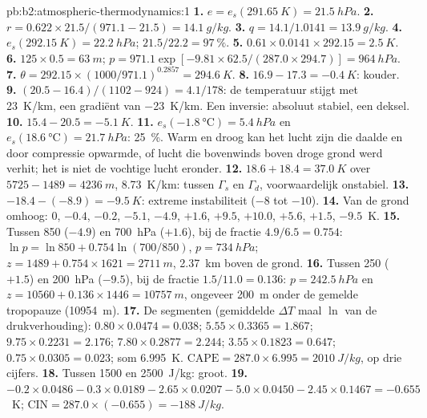 \begin{solution}{pb:b2:atmospheric-thermodynamics:1}
\textbf{1.} $e = e_s(\qty{291.65}{K}) = \qty{21.5}{hPa}$.
\textbf{2.} $r = 0.622 \times 21.5/(971.1 - 21.5) = \qty{14.1}{g/kg}$.
\textbf{3.} $q = 14.1/1.0141 = \qty{13.9}{g/kg}$.
\textbf{4.} $e_s(\qty{292.15}{K}) = \qty{22.2}{hPa}$; $21.5/22.2 = \qty{97}{\percent}$.
\textbf{5.} $0.61 \times 0.0141 \times 292.15 = \qty{2.5}{K}$.
\textbf{6.} $125 \times 0.5 = \qty{63}{m}$; $p = 971.1 \exp[-9.81 \times 62.5/(287.0 \times 294.7)]
= \qty{964}{hPa}$.
\textbf{7.} $\theta = 292.15 \times (1000/971.1)^{0.2857} = \qty{294.6}{K}$.
\textbf{8.} $16.9 - 17.3 = \qty{-0.4}{K}$: kouder.
\textbf{9.} $(20.5 - 16.4)/(1102 - 924) = 4.1/178$: de temperatuur stijgt met \qty{23}{K/km}, een
gradiënt van \qty{-23}{K/km}. Een inversie: absoluut stabiel, een deksel.
\textbf{10.} $15.4 - 20.5 = \qty{-5.1}{K}$.
\textbf{11.} $e_s(\qty{-1.8}{\celsius}) = \qty{5.4}{hPa}$ en $e_s(\qty{18.6}{\celsius}) =
\qty{21.7}{hPa}$: \qty{25}{\percent}. Warm en droog kan het lucht zijn die daalde en door
compressie opwarmde, of lucht die bovenwinds boven droge grond werd verhit; het is niet de vochtige lucht eronder.
\textbf{12.} $18.6 + 18.4 = \qty{37.0}{K}$ over $5725 - 1489 = \qty{4236}{m}$, \qty{8.73}{K/km}: tussen $\Gamma_s$ en
$\Gamma_d$, voorwaardelijk onstabiel.
\textbf{13.} $-18.4 - (-8.9) = \qty{-9.5}{K}$: extreme instabiliteit ($-8$ tot $-10$).
\textbf{14.} Van de grond omhoog: 0, $-0.4$, $-0.2$, $-5.1$, $-4.9$, $+1.6$, $+9.5$, $+10.0$,
$+5.6$, $+1.5$, $-9.5$~\unit{K}.
\textbf{15.} Tussen 850 ($-4.9$) en \qty{700}{hPa} ($+1.6$), bij de fractie $4.9/6.5 = 0.754$:
$\ln p = \ln 850 + 0.754 \ln(700/850)$, $p = \qty{734}{hPa}$; $z = 1489 + 0.754 \times 1621 =
\qty{2711}{m}$, \qty{2.37}{km} boven de grond.
\textbf{16.} Tussen 250 ($+1.5$) en \qty{200}{hPa} ($-9.5$), bij de fractie $1.5/11.0 =
0.136$: $p = \qty{242.5}{hPa}$ en $z = 10560 + 0.136 \times 1446 = \qty{10757}{m}$, ongeveer
\qty{200}{m} onder de gemelde tropopauze (\qty{10954}{m}).
\textbf{17.} De segmenten (gemiddelde $\Delta T$ maal $\ln$ van de drukverhouding): $0.80 \times 0.0474
= 0.038$; $5.55 \times 0.3365 = 1.867$; $9.75 \times 0.2231 = 2.176$; $7.80 \times 0.2877 =
2.244$; $3.55 \times 0.1823 = 0.647$; $0.75 \times 0.0305 = 0.023$; som \qty{6.995}{K}.
$\text{CAPE} = 287.0 \times 6.995 = \qty{2010}{J/kg}$, op drie cijfers.
\textbf{18.} Tussen 1500 en \qty{2500}{J/kg}: groot.
\textbf{19.} $-0.2 \times 0.0486 - 0.3 \times 0.0189 - 2.65 \times 0.0207 - 5.0 \times 0.0450 -
2.45 \times 0.1467 = -0.655$~\unit{K}; $\text{CIN} = 287.0 \times (-0.655) = \qty{-188}{J/kg}$.

\end{solution}
